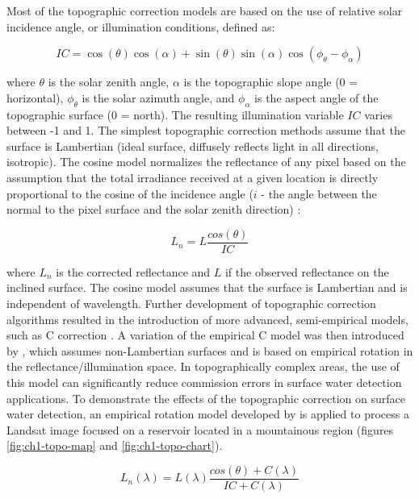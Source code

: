 Most of the topographic correction models are based on the use of relative solar incidence angle, or illumination conditions, defined as: 

\begin{equation}
\label{eq:ic}
IC = \cos(\theta) \cos(\alpha) + \sin(\theta) \sin(\alpha) \cos(\phi_{\theta} - \phi_{\alpha})
\end{equation}

where $\theta$ is the solar zenith angle, $\alpha$ is the topographic slope angle (0 = horizontal), $\phi_{\theta}$ is the solar azimuth angle, and $\phi_{\alpha}$ is the aspect angle of the topographic surface (0 = north). The resulting illumination variable $IC$ varies between -1 and 1. The simplest topographic correction methods assume that the surface is Lambertian (ideal surface, diffusely reflects light in all directions, isotropic). The cosine model normalizes the reflectance of any pixel based on the assumption that the total irradiance received at a given location is directly proportional to the cosine of the incidence angle ($i$ - the angle between the normal to the pixel surface and the solar zenith direction) \citet{teillet1982slope}:

\begin{equation}
\label{eq:cosine}
L_n = L \frac{cos(\theta)}{IC}
\end{equation}

where $L_n$ is the corrected reflectance and $L$ if the observed reflectance on the inclined surface. The cosine model assumes that the surface is Lambertian and is independent of wavelength. Further development of topographic correction algorithms resulted in the introduction of more advanced, semi-empirical models, such as C correction \citet{teillet1982slope}. A variation of the empirical C model was then introduced by \citet{tan2013improved}, which assumes non-Lambertian surfaces and is based on empirical rotation in the reflectance/illumination space. In topographically complex areas, the use of this model can significantly reduce commission errors in surface water detection applications. To demonstrate the effects of the topographic correction on surface water detection, an empirical rotation model developed by \citet{tan2013improved} is applied to process a Landsat image focused on a reservoir located in a mountainous region (figures \ref{fig:ch1-topo-map} and \ref{fig:ch1-topo-chart}).

\begin{equation}
\label{eq:topo-c}
L_n(\lambda) = L(\lambda) \frac{cos(\theta) + C(\lambda)}{IC + C(\lambda)}
\end{equation}

